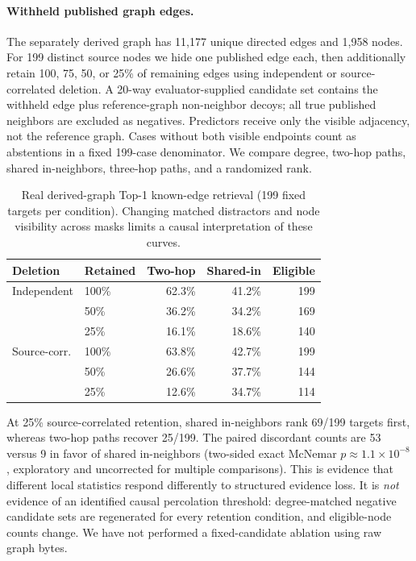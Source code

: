 \documentclass[10pt,twocolumn]{article}
\begin{document}
\paragraph{Withheld published graph edges.} The separately derived graph has 11,177 unique directed edges and 1,958 nodes. For 199 distinct source nodes we hide one published edge each, then additionally retain 100, 75, 50, or 25\% of remaining edges using independent or source-correlated deletion. A 20-way evaluator-supplied candidate set contains the withheld edge plus reference-graph non-neighbor decoys; all true published neighbors are excluded as negatives. Predictors receive only the visible adjacency, not the reference graph. Cases without both visible endpoints count as abstentions in a fixed 199-case denominator. We compare degree, two-hop paths, shared in-neighbors, three-hop paths, and a randomized rank.

\begin{table}[t]
\centering
\caption{Real derived-graph Top-1 known-edge retrieval (199 fixed targets per condition). Changing matched distractors and node visibility across masks limits a causal interpretation of these curves.}
\label{tab:wiki_graph}
\setlength{\tabcolsep}{3pt}\footnotesize
\begin{tabular}{@{}llrrr@{}}\toprule
Deletion & Retained & Two-hop & Shared-in & Eligible \\\midrule
Independent & 100\% & 62.3\% & 41.2\% & 199\\
 & 50\% & 36.2\% & 34.2\% & 169\\
 & 25\% & 16.1\% & 18.6\% & 140\\
Source-corr. & 100\% & 63.8\% & 42.7\% & 199\\
 & 50\% & 26.6\% & 37.7\% & 144\\
 & 25\% & 12.6\% & 34.7\% & 114\\\bottomrule
\end{tabular}
\end{table}

At 25\% source-correlated retention, shared in-neighbors rank 69/199 targets first, whereas two-hop paths recover 25/199. The paired discordant counts are 53 versus 9 in favor of shared in-neighbors (two-sided exact McNemar $p\approx 1.1\times10^{-8}$, exploratory and uncorrected for multiple comparisons). This is evidence that different local statistics respond differently to structured evidence loss. It is \emph{not} evidence of an identified causal percolation threshold: degree-matched negative candidate sets are regenerated for every retention condition, and eligible-node counts change. We have not performed a fixed-candidate ablation using raw graph bytes.
\end{document}

